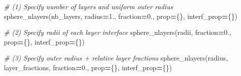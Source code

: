 \documentclass[
  a4paper,
  numbers=noendperiod,
  DIV=12]{scrreprt}
\newenvironment{Shaded}{\begin{snugshade}}{\end{snugshade}}
\newcommand{\CommentTok}[1]{\textcolor[rgb]{0.56,0.35,0.01}{\textit{#1}}}
\newcommand{\FloatTok}[1]{\textcolor[rgb]{0.00,0.00,0.81}{#1}}
\newcommand{\NormalTok}[1]{#1}
\newcommand{\OperatorTok}[1]{\textcolor[rgb]{0.81,0.36,0.00}{\textbf{#1}}}
\begin{document}
\begin{Shaded}
\begin{Highlighting}[]
\CommentTok{\# (1) Specify number of layers and uniform outer radius}
\NormalTok{sphere\_nlayers(nb\_layers, radius}\OperatorTok{=}\FloatTok{1.}\NormalTok{, fraction}\OperatorTok{=}\FloatTok{0.}\NormalTok{, prop}\OperatorTok{=}\NormalTok{\{\}, interf\_prop}\OperatorTok{=}\NormalTok{\{\})}

\CommentTok{\# (2) Specify radii of each layer interface}
\NormalTok{sphere\_nlayers(radii, fraction}\OperatorTok{=}\FloatTok{0.}\NormalTok{, prop}\OperatorTok{=}\NormalTok{\{\}, interf\_prop}\OperatorTok{=}\NormalTok{\{\})}

\CommentTok{\# (3) Specify outer radius + relative layer fractions}
\NormalTok{sphere\_nlayers(radius, layer\_fractions, fraction}\OperatorTok{=}\FloatTok{0.}\NormalTok{, prop}\OperatorTok{=}\NormalTok{\{\}, interf\_prop}\OperatorTok{=}\NormalTok{\{\})}
\end{Highlighting}
\end{Shaded}
\end{document}
